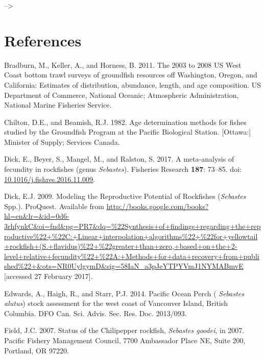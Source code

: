 \documentclass[12pt,]{article}
\begin{document}
\newpage

--\textgreater{} \color{black}

\section{References}\label{references}

\renewcommand{\thepage}{}

\hypertarget{refs}{}
\hypertarget{ref-bradburn_2003_2011}{}
Bradburn, M., Keller, A., and Horness, B. 2011. The 2003 to 2008 US West
Coast bottom trawl surveys of groundfish resources off Washington,
Oregon, and California: Estimates of distribution, abundance, length,
and age composition. US Department of Commerce, National Oceanic;
Atmospheric Administration, National Marine Fisheries Service.

\hypertarget{ref-chilton_age_1982}{}
Chilton, D.E., and Beamish, R.J. 1982. Age determination methods for
fishes studied by the Groundfish Program at the Pacific Biological
Station. {[}Ottawa:{]} Minister of Supply; Services Canada.

\hypertarget{ref-dick_meta-analysis_2017}{}
Dick, E., Beyer, S., Mangel, M., and Ralston, S. 2017. A meta-analysis
of fecundity in rockfishes (genus \emph{Sebastes}). Fisheries Research
\textbf{187}: 73--85. doi:
\href{https://doi.org/10.1016/j.fishres.2016.11.009}{10.1016/j.fishres.2016.11.009}.

\hypertarget{ref-dick_modeling_2009}{}
Dick, E.J. 2009. Modeling the Reproductive Potential of Rockfishes
(\emph{Sebastes} Spp.). ProQuest. Available from
\url{http://books.google.com/books?hl=en\&lr=\&id=0d6-3rhfynkC\&oi=fnd\&pg=PR7\&dq=\%22Synthesis+of+findings+regarding+the+reproductive\%22+\%22C:+Linear+interpolation+algorithms\%22+\%22for+yellowtail+rockfish+(S.+flavidus)\%22+\%22greater+than+zero,+based+on+the+2-level+relative+fecundity\%22+\%22A:+Methods+for+data+recovery+from+published\%22+\&ots=NR0UylgymD\&sig=58IaN_a3pJeYTPYVmJ1NYMABmvE}
{[}accessed 27 February 2017{]}.

\hypertarget{ref-edwards_pacific_2014}{}
Edwards, A., Haigh, R., and Starr, P.J. 2014. Pacific Ocean Perch (
\emph{Sebastes alutus}) stock assessment for the west coast of Vancouver
Island, British Columbia. DFO Can. Sci. Advis. Sec. Res. Doc. 2013/093.

\hypertarget{ref-field_status_2007}{}
Field, J.C. 2007. Status of the Chilipepper rockfish, \emph{Sebastes
goodei}, in 2007. Pacific Fishery Management Council, 7700 Ambassador
Place NE, Suite 200, Portland, OR 97220.
\end{document}
